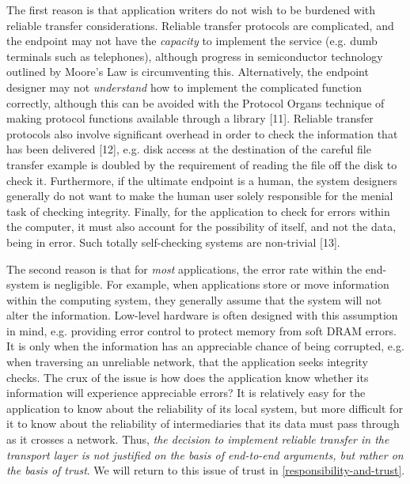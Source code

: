 \documentclass[a4paper,11pt,notitlepage,twoside,openright]{article}
\begin{document}
The first reason is that application writers do not wish to be burdened
with reliable transfer considerations. Reliable transfer protocols are
complicated, and the endpoint may not have the \emph{capacity} to
implement the service (e.g. dumb terminals such as telephones), although
progress in semiconductor technology outlined by Moore's Law is
circumventing this. Alternatively, the endpoint designer may not
\emph{understand} how to implement the complicated function correctly,
although this can be avoided with the Protocol Organs technique of
making protocol functions available through a library {[}11{]}. Reliable
transfer protocols also involve significant overhead in order to check
the information that has been delivered {[}12{]}, e.g. disk access at
the destination of the careful file transfer example is doubled by the
requirement of reading the file off the disk to check it. Furthermore,
if the ultimate endpoint is a human, the system designers generally do
not want to make the human user solely responsible for the menial task
of checking integrity. Finally, for the application to check for errors
within the computer, it must also account for the possibility of itself,
and not the data, being in error. Such totally self-checking systems are
non-trivial {[}13{]}.

The second reason is that for \emph{most} applications, the error rate
within the end-system is negligible. For example, when applications
store or move information within the computing system, they generally
assume that the system will not alter the information. Low-level
hardware is often designed with this assumption in mind, e.g. providing
error control to protect memory from soft DRAM errors. It is only when
the information has an appreciable chance of being corrupted, e.g. when
traversing an unreliable network, that the application seeks integrity
checks. The crux of the issue is how does the application know whether
its information will experience appreciable errors? It is relatively
easy for the application to know about the reliability of its local
system, but more difficult for it to know about the reliability of
intermediaries that its data must pass through as it crosses a network.
Thus, \emph{the decision to implement reliable transfer in the transport
layer is not justified on the basis of end-to-end arguments, but rather
on the basis of trust}. We will return to this issue of trust in \autoref{responsibility-and-trust}.
\end{document}
